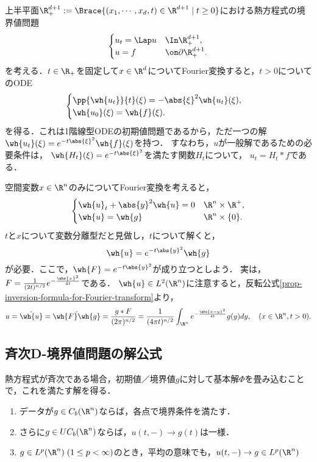 \documentclass[uplatex,dvipdfmx]{jsreport}
\begin{document}
\begin{observation}
    上半平面$\R^{d+1}_+:=\Brace{(x_1,\cdots,x_d,t)\in\R^{d+1}\mid t\ge0}$における熱方程式の境界値問題
    \[\begin{cases}
        u_t=\Lap u&\In \R^{d+1}_+,\\
        u=f&\on\partial\R^{d+1}_+.
    \end{cases}\]
    を考える．$t\in\R_+$を固定して$x\in\R^d$についてFourier変換すると，$t>0$についてのODE
    \[\begin{cases}
        \pp{\wh{u_t}}{t}(\xi)=-\abs{\xi}^2\wh{u_t}(\xi),\\
        \wh{u_0}(\xi)=\wh{f}(\xi).
    \end{cases}\]
    を得る．これは1階線型ODEの初期値問題であるから，ただ一つの解$\wh{u_t}(\xi)=e^{-t\abs{\xi}^2}\wh{f}(\xi)$を持つ．
    すなわち，$u$が一般解であるための必要条件は，
    $\wh{H_t}(\xi)=e^{-t\abs{\xi}^2}$を満たす関数$H_t$について，
    $u_t=H_t*f$である．
\end{observation}

\begin{observation}
    空間変数$x\in\R^n$のみについてFourier変換を考えると，
    \[\begin{cases}
        \wh{u}_t+\abs{y}^2\wh{u}=0&\R^n\times\R^+,\\
        \wh{u}=\wh{g}&\R^n\times\{0\}.
    \end{cases}\]
    $t$と$x$について変数分離型だと見做し，$t$について解くと，
    \[\wh{u}=e^{-t\abs{y}^2}\wh{g}\]
    が必要．ここで，$\wh{F}=e^{-t\abs{y}^2}$が成り立つとしよう．
    実は，$F=\frac{1}{(2t)^{n/2}}e^{-\frac{\abs{x}^2}{4t}}$である．
    $\wh{u}\in L^2(\R^n)$に注意すると，反転公式\ref{prop-inversion-formula-for-Fourier-transform}より，
    \[u=\check{\wh{u}}=\check{\wh{F}\wh{g}}=\frac{g*F}{(2\pi)^{n/2}}=\frac{1}{(4\pi t)^{n/2}}\int_{\R^n}e^{-\frac{\abs{x-y}^2}{4t}}g(y)dy,\quad(x\in\R^n,t>0).\]
\end{observation}

\subsection{斉次D-境界値問題の解公式}

\begin{tcolorbox}[colframe=ForestGreen, colback=ForestGreen!10!white,breakable,colbacktitle=ForestGreen!40!white,coltitle=black,fonttitle=\bfseries\sffamily,
title=]
    熱方程式が斉次である場合，初期値／境界値$g$に対して基本解$\Phi$を畳み込むことで，これを満たす解を得る．
    \begin{enumerate}
        \item データが$g\in C_b(\R^n)$ならば，各点で境界条件を満たす．
        \item さらに$g\in UC_b(\R^n)$ならば，$u(t,-)\to g(t)$は一様．
        \item $g\in L^p(\R^n)\;(1\le p<\infty)$のとき，平均の意味でも，$u(t,-)\to g\in L^p(\R^n)$
    \end{enumerate}
\end{tcolorbox}
\end{document}
